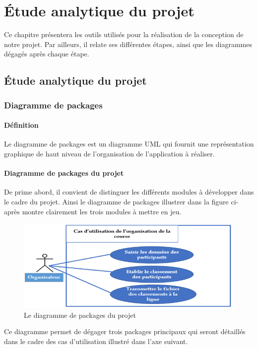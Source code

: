 \documentclass[12pt,a4paper]{report}
\begin{document}
	\chapter{Étude analytique du projet}

Ce chapitre présentera les outils utilisés pour la réalisation de la conception de notre projet. Par ailleurs, il relate ses différentes étapes, ainsi que les diagrammes dégagés après chaque étape.
\newpage
\section {Étude analytique du projet}


\subsection {Diagramme de packages }
\subsubsection{Définition}
Le diagramme de packages est un diagramme UML qui fournit une représentation graphique de haut niveau de l'organisation de l’application à réaliser.
\subsubsection{Diagramme de packages du projet}
De prime abord, il convient de distinguer les différents modules à développer dans le cadre du projet. Ainsi le diagramme de packages illustrer dans la figure ci-après montre clairement les trois modules à mettre en jeu.
\begin{figure}[!h]
	   \center
	   \includegraphics[scale=0.9]{img/Diagramme_de_packages.png}
	   \caption {Le diagramme de packages du projet}
\end{figure}

Ce diagramme permet de dégager trois packages principaux qui seront détaillés dans le cadre des cas d’utilisation illustré dans l’axe suivant.
\end{document}
